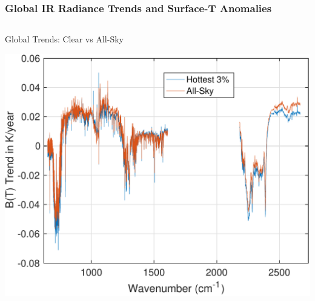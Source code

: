 \documentclass[10pt,t]{beamer}
\begin{document}
\begin{frame}
\frametitle{Global IR Radiance Trends and Surface-T Anomalies}  
\vspace{-0.35in}

\begin{columns}
\begin{column}{0.55\columnwidth}
\begin{block}{\footnotesize Global Trends: Clear vs All-Sky}
\vspace{-0.1in}
\begin{center}
\includegraphics[width=\linewidth]{SunClimate2022/global_trends_hottest3pc_and)allsky.pdf}
\end{center}
\end{block}
\end{column}



\end{columns}
\end{frame}
\end{document}
